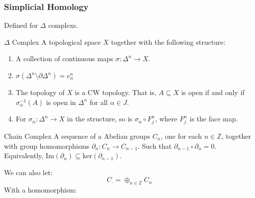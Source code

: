 \documentclass[crop=false,class=book,oneside]{standalone}
\begin{document}
            \subsubsection{Simplicial Homology}
                Defined for $\Delta$ complexs.
                \begin{ldefinition}{$\Delta$ Complex}
                    A topological space $X$ together with the
                    following structure:
                    \begin{enumerate}
                        \item A collection of continuous
                              maps $\sigma:\Delta^{n}\rightarrow{X}$.
                        \item $\sigma(\Delta^{n}\setminus%
                               \partial\Delta^{n})=e_{\alpha}^{n}$
                        \item The topology of $X$ is a CW topology.
                              That is, $A\subseteq{X}$ is open
                              if and only if
                              $\sigma_{\alpha}^{\minus{1}}(A)$ is
                              open in $\Delta^{n}$ for all
                              $\alpha\in{J}$.
                        \item For $\sigma_{\alpha}:%
                              \Delta^{n}\rightarrow{X}$ in the
                              structure, so is
                              $\sigma_{\alpha}\circ{F}_{j}^{n}$,
                              where $F_{j}^{n}$ is the face map.
                    \end{enumerate}
                \end{ldefinition}
                \begin{ldefinition}{Chain Complex}
                    A sequence of a Abelian groups
                    $C_{n}$, one for each $n\in\mathbb{Z}$,
                    together with group homomorphisms
                    $\partial_{n}:C_{n}\rightarrow{C}_{n-1}$.
                    Such that $\partial_{n-1}\circ\partial_{n}=0$. 
                    Equivalently,
                    $\mathrm{Im}(\partial_{n})\subseteq%
                     \mathrm{ker}(\partial_{n-1})$.
                \end{ldefinition}
                We can also let:
                \begin{equation}
                    C_{\cdot}=\oplus_{n\in\mathbb{Z}}C_{n}
                \end{equation}
                With a homomorphism:
\end{document}
